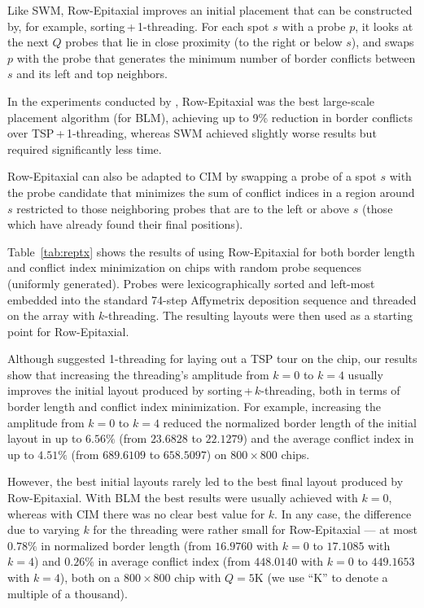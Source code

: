 Like SWM, Row-Epitaxial improves an initial placement that can be constructed
by, for example, sorting\,+\,1-threading. For each spot $s$ with a probe $p$,
it looks at the next $Q$ probes that lie in close proximity (to the right or
below $s$), and swaps $p$ with the probe that generates the minimum number of
border conflicts between $s$ and its left and top neighbors.

In the experiments conducted by \citet{Kahng2003,Kahng2004}, Row-Epitaxial was
the best large-scale placement algorithm (for BLM), achieving up to 9\%
reduction in border conflicts over TSP\,+\,1-threading, whereas SWM achieved
slightly worse results but required significantly less time.

Row-Epitaxial can also be adapted to CIM by swapping a probe of a spot $s$ with
the probe candidate that minimizes the sum of conflict indices in a region
around $s$ restricted to those neighboring probes that are to the left or above
$s$ (those which have already found their final positions).

Table~\ref{tab:reptx} shows the results of using Row-Epitaxial for both border
length and conflict index minimization on chips with random probe sequences
(uniformly generated). Probes were lexicographically sorted and left-most
embedded into the standard 74-step Affymetrix deposition sequence and threaded
on the array with $k$-threading. The resulting layouts were then used as a
starting point for Row-Epitaxial.

Although \citet{Hannenhalli2002} suggested 1-threading for laying out a TSP tour
on the chip, our results show that increasing the threading's amplitude from
$k=0$ to $k=4$ usually improves the initial layout produced by
sorting\,+\,$k$-threading, both in terms of border length and conflict index
minimization. For example, increasing the amplitude from $k=0$ to $k=4$ reduced
the normalized border length of the initial layout in up to $6.56\%$ (from
$23.6828$ to $22.1279$) and the average conflict index in up to $4.51\%$ (from
$689.6109$ to $658.5097$) on $800\times 800$ chips.

However, the best initial layouts rarely led to the best final layout produced
by Row-Epitaxial. With BLM the best results were usually achieved with $k=0$,
whereas with CIM there was no clear best value for $k$. In any case, the
difference due to varying $k$ for the threading were rather small for
Row-Epitaxial --- at most $0.78\%$ in normalized border length (from $16.9760$
with $k=0$ to $17.1085$ with $k=4$) and $0.26\%$ in average conflict index (from
$448.0140$ with $k=0$ to $449.1653$ with $k=4$), both on a $800\times 800$ chip
with $Q=5$K (we use ``K'' to denote a multiple of a thousand).

